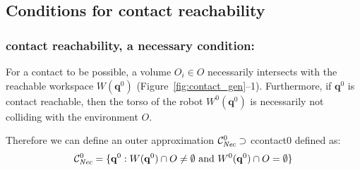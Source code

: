 


   
 
\subsection{Conditions for contact reachability}




\subsubsection*{contact reachability, a necessary condition:}
For a contact to be possible, a volume $O_i \in O$ necessarily intersects with the reachable workspace $W(\mathbf{q}^{0})$ (Figure~\ref{fig:contact_gen}--1). Furthermore, if $\mathbf{q}^{0}$ is \gls{contact reachable}, then the torso of the robot $W^0(\mathbf{q}^{0})$ is necessarily not colliding  with the environment $O$.

Therefore we can define an outer approximation  $ \mathcal{C}^0_{\textrm{\it Nec}} \supset$ \gls{ccontact0} defined as: 
\begin{equation}
\mathcal{C}^0_{\textrm{\it Nec}} = \{ \mathbf{q}^0 : W(\mathbf{q}^{0}) \cap O \neq \emptyset \text{ and } W^0(\mathbf{q}^{0}) \cap O = \emptyset \} %
\end{equation}
 
